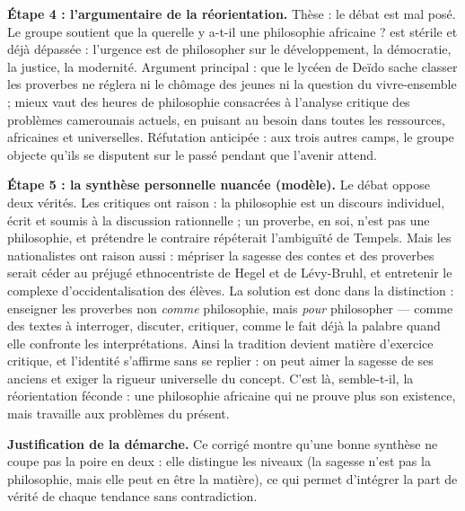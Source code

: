 \documentclass[11pt]{article}
\newcounter{popsec}
\newcounter{popsub}
\newcommand{\courssub}[1]{%
  \stepcounter{popsub}%
  \par\vspace{9pt}\noindent{\popxbold\fontsize{11.5}{13}\selectfont\color{popink}{\color{poporange}\thepopsec.\thepopsub}\hspace{6pt}#1}\par\nopagebreak\vspace{4pt}
}
\begin{document}
\begin{exoresolu}
\textbf{Étape 4 : l'argumentaire de la réorientation.} Thèse : le débat est mal posé. Le groupe soutient que la querelle \guillemotleft y a-t-il une philosophie africaine ? \guillemotright est stérile et déjà dépassée : l'urgence est de philosopher sur le développement, la démocratie, la justice, la modernité. Argument principal : que le lycéen de Deïdo sache classer les proverbes ne réglera ni le chômage des jeunes ni la question du vivre-ensemble ; mieux vaut des heures de philosophie consacrées à l'analyse critique des problèmes camerounais actuels, en puisant au besoin dans toutes les ressources, africaines et universelles. Réfutation anticipée : aux trois autres camps, le groupe objecte qu'ils se disputent sur le passé pendant que l'avenir attend.

\textbf{Étape 5 : la synthèse personnelle nuancée (modèle).} \guillemotleft Le débat oppose deux vérités. Les critiques ont raison : la philosophie est un discours individuel, écrit et soumis à la discussion rationnelle ; un proverbe, en soi, n'est pas une philosophie, et prétendre le contraire répéterait l'ambiguïté de Tempels. Mais les nationalistes ont raison aussi : mépriser la sagesse des contes et des proverbes serait céder au préjugé ethnocentriste de Hegel et de Lévy-Bruhl, et entretenir le complexe d'occidentalisation des élèves. La solution est donc dans la distinction : enseigner les proverbes non \emph{comme} philosophie, mais \emph{pour} philosopher — comme des textes à interroger, discuter, critiquer, comme le fait déjà la palabre quand elle confronte les interprétations. Ainsi la tradition devient matière d'exercice critique, et l'identité s'affirme sans se replier : on peut aimer la sagesse de ses anciens et exiger la rigueur universelle du concept. C'est là, semble-t-il, la réorientation féconde : une philosophie africaine qui ne prouve plus son existence, mais travaille aux problèmes du présent. \guillemotright

\textbf{Justification de la démarche.} Ce corrigé montre qu'une bonne synthèse ne \guillemotleft coupe pas la poire en deux \guillemotright : elle distingue les niveaux (la sagesse n'est pas la philosophie, mais elle peut en être la matière), ce qui permet d'intégrer la part de vérité de chaque tendance sans contradiction.
\end{exoresolu}

\courssub{Bilan de l'activité}
\end{document}
